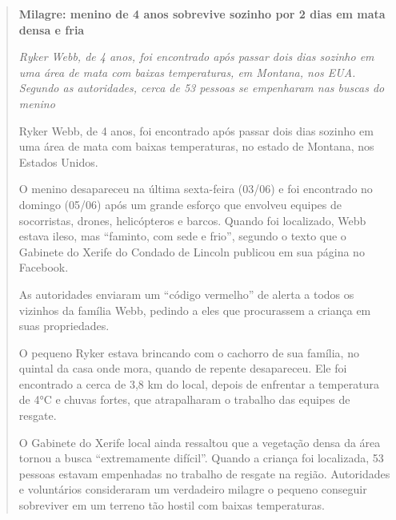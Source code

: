

\begin{quote}
\textbf{Milagre: menino de 4 anos sobrevive sozinho por 2 dias em mata densa e fria}

\emph{Ryker Webb, de 4 anos, foi encontrado após passar dois dias
sozinho em uma área de mata com baixas temperaturas, em Montana, nos
EUA. Segundo as autoridades, cerca de 53 pessoas se empenharam nas
buscas do menino}

Ryker Webb, de 4 anos, foi encontrado após passar dois dias sozinho em
uma área de mata com baixas temperaturas, no estado de Montana, nos
Estados Unidos.

O menino desapareceu na última sexta-feira (03/06) e foi encontrado no
domingo (05/06) após um grande esforço que envolveu equipes de
socorristas, drones, helicópteros e barcos. Quando foi localizado, Webb
estava ileso, mas ``faminto, com sede e frio'', segundo o texto que o
Gabinete do Xerife do Condado de Lincoln publicou em sua página no
Facebook.

As autoridades enviaram um ``código vermelho'' de alerta a todos os
vizinhos da família Webb, pedindo a eles que procurassem a criança em
suas propriedades.

O pequeno Ryker estava brincando com o cachorro de sua família, no
quintal da casa onde mora, quando de repente desapareceu. Ele foi
encontrado a cerca de 3,8 km do local, depois de enfrentar a temperatura
de 4°C e chuvas fortes, que atrapalharam o trabalho das equipes de
resgate.

O Gabinete do Xerife local ainda ressaltou que a vegetação densa da área
tornou a busca ``extremamente difícil''. Quando a criança foi
localizada, 53 pessoas estavam empenhadas no trabalho
de resgate na
região. Autoridades e voluntários consideraram um verdadeiro milagre o
pequeno conseguir sobreviver em um terreno tão hostil com baixas
temperaturas.
\end{quote}


